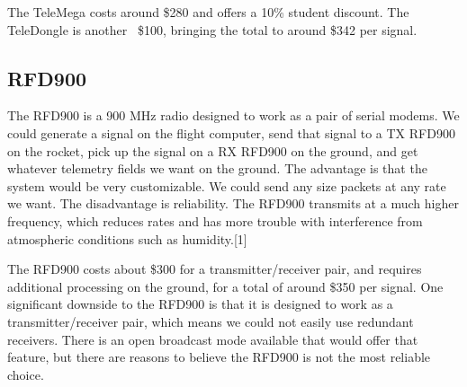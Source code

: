 \documentclass[onecolumn, draftclsnofoot, 10pt, compsoc]{IEEEtran}
\begin{document}
The TeleMega costs around \$280 and offers a 10\% student discount.  The TeleDongle is another ~\$100, bringing the total to around \$342 per signal.

\subsection{RFD900}
The RFD900 is a 900 MHz radio designed to work as a pair of serial modems.  We could generate a signal on the flight computer, send that signal to a TX RFD900 on the rocket, pick up the signal on a RX RFD900 on the ground, and get whatever telemetry fields we want on the ground.  The advantage is that the system would be very customizable.  We could send any size packets at any rate we want.  The disadvantage is reliability.  The RFD900 transmits at a much higher frequency, which reduces rates and has more trouble with interference from atmospheric conditions such as humidity.[1]

The RFD900 costs about \$300 for a transmitter/receiver pair, and requires additional processing on the ground, for a total of around \$350 per signal.  One significant downside to the RFD900 is that it is designed to work as a transmitter/receiver pair, which means we could not easily use redundant receivers.  There is an open broadcast mode available that would offer that feature, but there are reasons to believe the RFD900 is not the most reliable choice.
\end{document}
